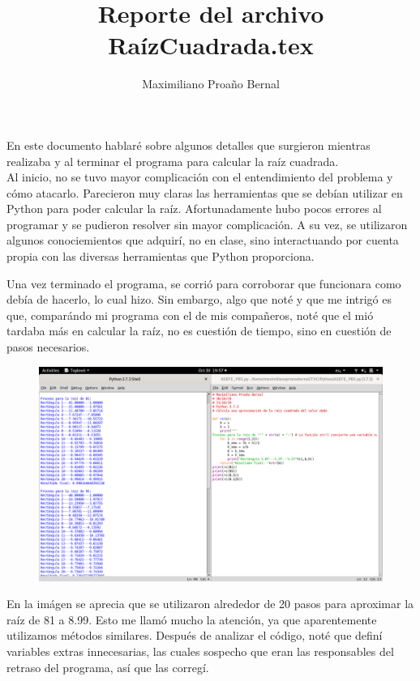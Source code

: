\documentclass[]{article}
\title{Reporte del archivo RaízCuadrada.tex}
\author{Maximiliano Proaño Bernal}
\begin{document}
\maketitle
En este documento hablaré sobre algunos detalles que surgieron mientras realizaba y al terminar el programa para calcular la raíz cuadrada.\\
Al inicio, no se tuvo mayor complicación con el entendimiento del problema y cómo atacarlo. Parecieron muy claras las herramientas que se debían utilizar en Python para poder calcular la raíz. Afortunadamente hubo pocos errores al programar y se pudieron resolver sin mayor complicación. A su vez, se utilizaron algunos conociemientos que adquirí, no en clase, sino interactuando por cuenta propia con las diversas herramientas que Python proporciona.

Una vez terminado el programa, se corrió para corroborar que funcionara como debía de hacerlo, lo cual hizo. Sin embargo, algo que noté y que me intrigó es que, comparándo mi programa con el de mis compañeros, noté que el mió tardaba más en calcular la raíz, no es cuestión de tiempo, sino en cuestión de pasos necesarios. 
\begin{figure}[H]
	\centering
	\includegraphics[width=1.02\linewidth]{"Imagenes/Captura 6"}
	\caption{}
	\label{fig:captura-6}
\end{figure}
En la imágen se aprecia que se utilizaron alrededor de 20 pasos para aproximar la raíz de 81 a 8.99. Esto me llamó mucho la atención, ya que aparentemente utilizamos métodos similares. Después de analizar el código, noté que definí variables extras innecesarias, las cuales sospecho que eran las responsables del retraso del programa, así que las corregí.
\end{document}
